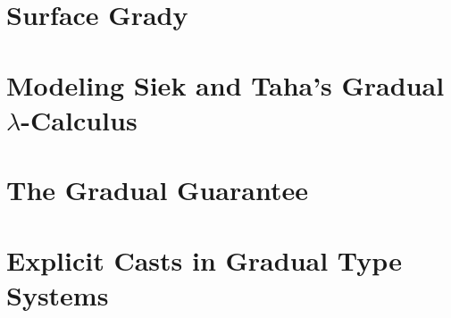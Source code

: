 \documentclass[sigplan]{acmart}\settopmatter{printfolios=true}
\begin{document}
\section{Surface Grady}
\label{sec:surface_grady}


\section{Modeling Siek and Taha's Gradual $\lambda$-Calculus}
\label{sec:modeling_siek_and_taha's_gradual_lambda-calculus}


\section{The Gradual Guarantee}
\label{sec:the_gradual_guarantee}


\section{Explicit Casts in Gradual Type Systems}
\label{sec:explicit_casts_in_gradual_type_systems}

\end{document}
